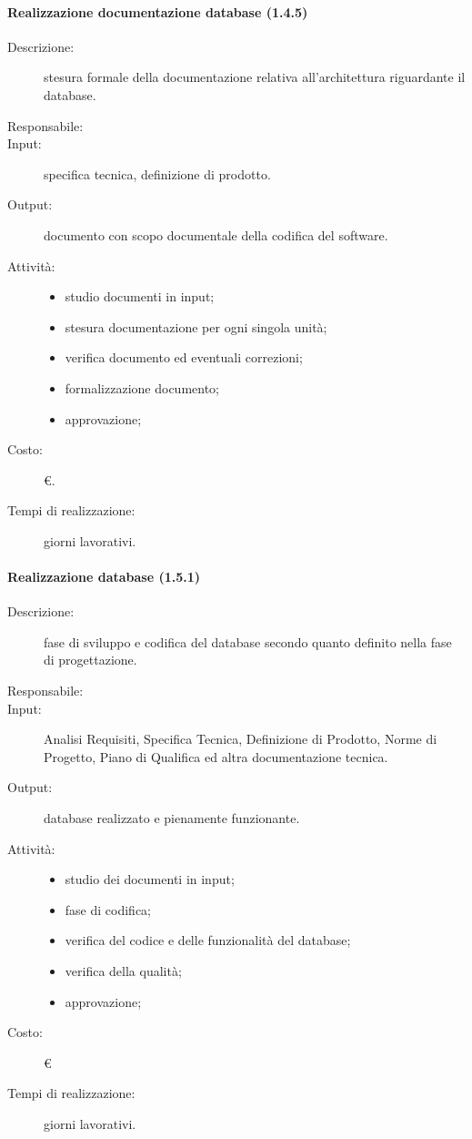\paragraph{Realizzazione documentazione database (1.4.5)}
\begin{description}
\item[Descrizione:] stesura formale della documentazione relativa all'architettura riguardante il database.
\item[Responsabile:] 
\item[Input:] specifica tecnica, definizione di prodotto.
\item[Output:] documento con scopo documentale della codifica del software.
\item[Attività:]
\begin{itemize}
\item studio documenti in input;
\item stesura documentazione per ogni singola unità;
\item verifica documento ed eventuali correzioni;
\item formalizzazione documento;
\item approvazione;
\end{itemize}
\item[Costo:] \euro{}.
\item[Tempi di realizzazione:]  giorni lavorativi.
\end{description}

\paragraph{Realizzazione database (1.5.1)}
\begin{description}
\item[Descrizione:] fase di sviluppo e codifica del database secondo quanto definito nella fase di progettazione.
\item[Responsabile:] 
\item[Input:] Analisi Requisiti, Specifica Tecnica, Definizione di Prodotto, Norme di Progetto, Piano di Qualifica ed altra documentazione tecnica.
\item[Output:]database realizzato e pienamente funzionante.
\item[Attività:]
\begin{itemize}
\item studio dei documenti in input;
\item fase di codifica;
\item verifica del codice e delle funzionalità del database;
\item verifica della qualità;
\item approvazione;
\end{itemize}
\item[Costo:] \euro{}
\item[Tempi di realizzazione:]  giorni lavorativi.
\end{description}

